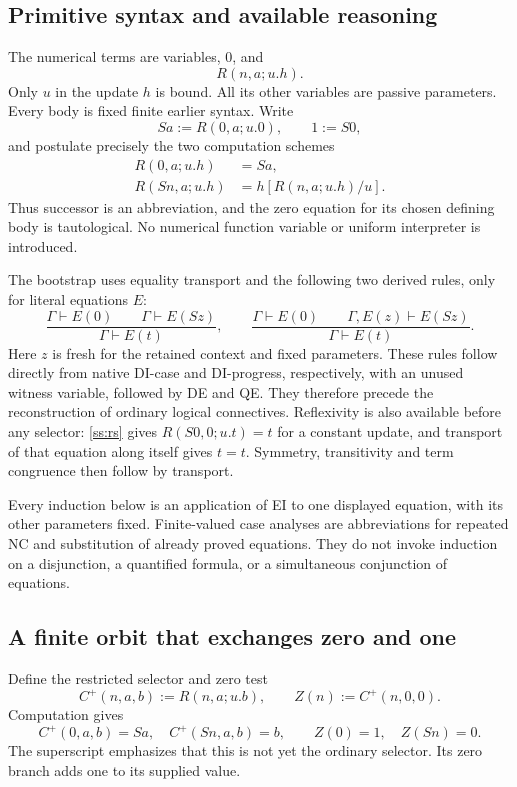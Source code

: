\documentclass[11pt,letterpaper]{article}
\theoremstyle{definition}\newtheorem{definition}[theorem]{Definition}
\theoremstyle{remark}\newtheorem{remark}[theorem]{Remark}
\begin{document}
\subsection{Primitive syntax and available reasoning}

The numerical terms are variables, $0$, and
\[
 R(n,a;u.h).
\]
Only $u$ in the update $h$ is bound.  All its other variables are passive
parameters.  Every body is fixed finite earlier syntax.  Write
\[
 Sa:=R(0,a;u.0),\qquad 1:=S0,
\]
and postulate precisely the two computation schemes
\begin{align}
 R(0,a;u.h)&=Sa,\tag{R0}\label{ss:r0}\\
 R(Sn,a;u.h)&=h[R(n,a;u.h)/u].\tag{RS}\label{ss:rs}
\end{align}
Thus successor is an abbreviation, and the zero equation for its chosen
defining body is tautological.  No numerical function variable or
uniform interpreter is introduced.

The bootstrap uses equality transport and the following two derived
rules, only for literal equations $E$:
\[
 \frac{\Gamma\vdash E(0)\qquad\Gamma\vdash E(Sz)}
      {\Gamma\vdash E(t)},\qquad
 \frac{\Gamma\vdash E(0)\qquad\Gamma,E(z)\vdash E(Sz)}
      {\Gamma\vdash E(t)}.
 \tag{NC, EI}\label{ss:nc-ei}
\]
Here $z$ is fresh for the retained context and fixed parameters.
These rules follow directly from native DI-case and DI-progress,
respectively, with an unused witness variable, followed by DE and QE.
They therefore precede the reconstruction of ordinary logical
connectives.  Reflexivity is also available before any selector:
\eqref{ss:rs} gives $R(S0,0;u.t)=t$ for a constant update, and transport
of that equation along itself gives $t=t$.  Symmetry, transitivity and
term congruence then follow by transport.

Every induction below is an application of EI to one displayed
equation, with its other parameters fixed.  Finite-valued case analyses
are abbreviations for repeated NC and substitution of already proved
equations.  They do not invoke induction on a disjunction, a quantified
formula, or a simultaneous conjunction of equations.

\subsection{A finite orbit that exchanges zero and one}

Define the restricted selector and zero test
\[
 C^+(n,a,b):=R(n,a;u.b),\qquad Z(n):=C^+(n,0,0).
\]
Computation gives
\[
 C^+(0,a,b)=Sa,\quad C^+(Sn,a,b)=b,\qquad
 Z(0)=1,\quad Z(Sn)=0.
\]
The superscript emphasizes that this is not yet the ordinary selector.
Its zero branch adds one to its supplied value.
\end{document}
